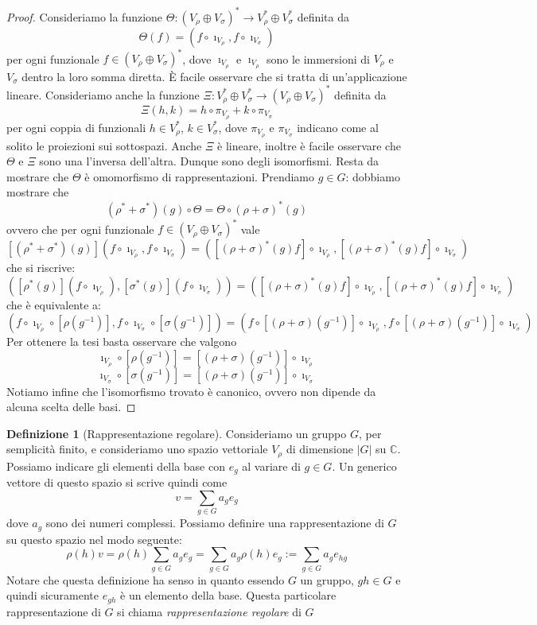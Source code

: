 \documentclass[11pt]{article}
\theoremstyle{plain}
\theoremstyle{definition}
\newtheorem{defn}{Definizione}[section]
\theoremstyle{remark}
\newcommand{\C}{\mathbb{C}}
\newcommand{\dsum}{\displaystyle\sum}
\begin{document}
\begin{proof}
Consideriamo la funzione $\Theta : (V_\rho \oplus V_\sigma)^*\to V_\rho ^* \oplus V_\sigma ^*$ definita da
\[ \Theta(f) = (f\circ \imath_{V_\rho}, f\circ \imath_{V_\sigma}) \]
per ogni funzionale $f\in (V_\rho \oplus V_\sigma)^*$, dove $\imath_{V_\rho}$ e $\imath_{V_\rho}$ sono le immersioni di $V_\rho$ e $V_\sigma$ dentro la loro somma diretta.
\`E facile osservare che si tratta di un'applicazione lineare. Consideriamo anche
la funzione $\Xi: V_\rho ^* \oplus V_\sigma ^* \to (V_\rho \oplus V_\sigma)^*$ definita da
\[ \Xi(h,k) = h\circ\pi_{V_\rho} + k\circ\pi_{V_\sigma} \]
per ogni coppia di funzionali $h\in V_\rho ^*$, $k\in V_\sigma ^*$,
dove $\pi_{V_\rho}$ e $\pi_{V_\sigma}$ indicano come al solito le proiezioni sui sottospazi.
Anche $\Xi$ è lineare, inoltre è facile osservare che $\Theta$ e $\Xi$ sono una l'inversa dell'altra. Dunque sono degli
isomorfismi. Resta da mostrare che $\Theta$ è omomorfismo di rappresentazioni. Prendiamo $g\in G$: dobbiamo mostrare che
\[ (\rho^*+\sigma^*)(g) \circ \Theta = \Theta \circ (\rho + \sigma)^*(g) \]
ovvero che per ogni funzionale $f\in (V_\rho \oplus V_\sigma)^*$ vale
\[ [(\rho^*+\sigma^*)(g)] (f\circ \imath_{V_\rho}, f\circ \imath_{V_\sigma}) = ([(\rho + \sigma)^*(g)f]\circ \imath_{V_\rho}, [(\rho + \sigma)^*(g)f]\circ \imath_{V_\sigma}) \]
che si riscrive:
\[ ([\rho^*(g)](f\circ \imath_{V_\rho}), [\sigma^*(g)](f\circ \imath_{V_\sigma})) = ([(\rho + \sigma)^*(g)f]\circ \imath_{V_\rho}, [(\rho + \sigma)^*(g)f]\circ \imath_{V_\sigma}) \]
che è equivalente a:
\[ (f\circ \imath_{V_\rho} \circ [\rho(g^{-1})], f\circ \imath_{V_\sigma}\circ[\sigma(g^{-1})]) = (f\circ [(\rho+\sigma)(g^{-1})] \circ \imath_{V_\rho} , f\circ[(\rho+\sigma)(g^{-1})]\circ \imath_{V_\sigma}) \]
Per ottenere la tesi basta osservare che valgono
\[ \imath_{V_\rho} \circ [\rho(g^{-1})] = [(\rho+\sigma)(g^{-1})] \circ \imath_{V_\rho}\]
\[\imath_{V_\sigma} \circ [\sigma(g^{-1})] = [(\rho+\sigma)(g^{-1})] \circ \imath_{V_\sigma}\]
Notiamo infine che l'isomorfismo trovato è canonico, ovvero non dipende da alcuna scelta delle basi.
\end{proof}





\begin{defn}[Rappresentazione regolare]
  Consideriamo un gruppo $G$, per semplicità finito, e consideriamo uno spazio vettoriale $V_\rho$ di dimensione $|G|$ su $\C$.
  Possiamo indicare gli elementi della base con $e_g$ al variare di $g \in G$. Un generico vettore di questo spazio si scrive quindi come
  \[ v = \dsum_{g \in G} a_g e_g \]
  dove $a_g$ sono dei numeri complessi. Possiamo definire una rappresentazione di $G$ su questo spazio nel modo seguente:
  \[ \rho(h)v = \rho(h) \dsum_{g \in G} a_g e_g = \dsum_{g\in G} a_g \rho(h) e_g := \dsum_{g \in G} a_g e_{hg} \]
  Notare che questa definizione ha senso in quanto essendo $G$ un gruppo, $gh \in G$ e quindi sicuramente $e_{gh}$ è un elemento della base. Questa particolare rappresentazione di $G$ si chiama \emph{rappresentazione regolare} di $G$

  \label{defn:rappresentazione regolare}
\end{defn}
\end{document}
